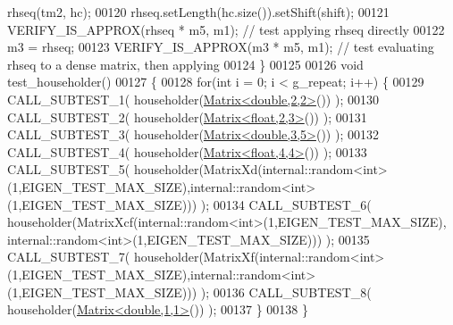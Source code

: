 \begin{DoxyCode}
       rhseq(tm2, hc);
00120   rhseq.setLength(hc.size()).setShift(shift);
00121   VERIFY\_IS\_APPROX(rhseq * m5, m1); \textcolor{comment}{// test applying rhseq directly}
00122   m3 = rhseq;
00123   VERIFY\_IS\_APPROX(m3 * m5, m1); \textcolor{comment}{// test evaluating rhseq to a dense matrix, then applying}
00124 \}
00125 
00126 \textcolor{keywordtype}{void} test\_householder()
00127 \{
00128   \textcolor{keywordflow}{for}(\textcolor{keywordtype}{int} i = 0; i < g\_repeat; i++) \{
00129     CALL\_SUBTEST\_1( householder(\hyperlink{group___core___module_class_eigen_1_1_matrix}{Matrix<double,2,2>}()) );
00130     CALL\_SUBTEST\_2( householder(\hyperlink{group___core___module_class_eigen_1_1_matrix}{Matrix<float,2,3>}()) );
00131     CALL\_SUBTEST\_3( householder(\hyperlink{group___core___module_class_eigen_1_1_matrix}{Matrix<double,3,5>}()) );
00132     CALL\_SUBTEST\_4( householder(\hyperlink{group___core___module_class_eigen_1_1_matrix}{Matrix<float,4,4>}()) );
00133     CALL\_SUBTEST\_5( householder(MatrixXd(internal::random<int>(1,EIGEN\_TEST\_MAX\_SIZE),internal::random<int>
      (1,EIGEN\_TEST\_MAX\_SIZE))) );
00134     CALL\_SUBTEST\_6( householder(MatrixXcf(internal::random<int>(1,EIGEN\_TEST\_MAX\_SIZE),
      internal::random<int>(1,EIGEN\_TEST\_MAX\_SIZE))) );
00135     CALL\_SUBTEST\_7( householder(MatrixXf(internal::random<int>(1,EIGEN\_TEST\_MAX\_SIZE),internal::random<int>
      (1,EIGEN\_TEST\_MAX\_SIZE))) );
00136     CALL\_SUBTEST\_8( householder(\hyperlink{group___core___module_class_eigen_1_1_matrix}{Matrix<double,1,1>}()) );
00137   \}
00138 \}
\end{DoxyCode}
